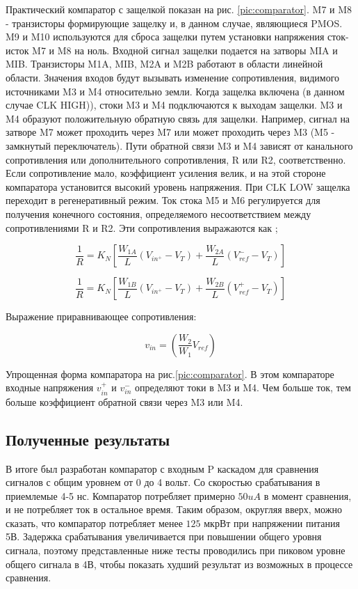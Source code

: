 \documentclass[a4paper,12pt]{article} %
\begin{document}
  Практический компаратор с защелкой показан на рис. \ref{pic:comparator}. M7 и M8 - транзисторы формирующие защелку и, в данном случае, являющиеся PMOS. M9 и M10 используются для сброса защелки путем установки напряжения сток-исток M7 и M8 на ноль. Входной сигнал защелки подается на затворы MIA и MIB. Транзисторы M1A, MIB, M2A и M2B работают в области линейной области. Значения входов будут вызывать изменение сопротивления, видимого источниками M3 и M4 относительно земли. Когда защелка включена (в данном случае CLK HIGH)), стоки M3 и M4 подключаются к  выходам защелки. M3 и M4 образуют положительную обратную связь для защелки. Например, сигнал на затворе M7 может проходить через M7 или может проходить через M3 (M5 - замкнутый переключатель).  Пути обратной связи M3 и M4 зависят от канального сопротивления  или дополнительного сопротивления, R или R2, соответственно. Если сопротивление мало, коэффициент усиления велик, и на этой стороне компаратора установится высокий уровень напряжения\cite{op_amp_comp13}.  При CLK LOW защелка переходит в регенеративный режим.  Ток стока M5 и M6 регулируется для получения конечного состояния, определяемого несоответствием между сопротивлениями R и R2.  Эти сопротивления выражаются как ; 



\begin{equation}
    \frac{1}{R} = K_N [ \frac{W_{ 1 A}}{L}(V_{in^+} - V_T) + \frac{W_{ 2 A }}{L}(V_{ref}^- - V_T) ]
\end{equation}


\begin{equation}
    \frac{1}{R} = K_N [ \frac{W_{ 1 B}}{L}(V_{in^+} - V_T) + \frac{W_{ 2 B }}{L}(V_{ref}^+ - V_T) ]
\end{equation} \label{some_label}

Выражение приравнивающее сопротивления:

$$ v_{in} = ( \frac{W_2}{W_1}V_{ref}) $$



Упрощенная форма компаратора на рис.\ref{pic:comparator}. В этом  компараторе входные напряжения $v_{in}^+$ и $v_{in}^-$ определяют токи в M3 и M4.  Чем больше ток, тем больше коэффициент обратной связи через M3 или M4.   

\subsection{Полученные результаты }


В итоге был разработан компаратор с входным P каскадом для сравнения сигналов с общим уровнем от 0 до 4 вольт. Со скоростью срабатывания в приемлемые 4-5 нс. Компаратор потребляет примерно $50uA$ в момент сравнения, и не потребляет ток в остальное время. Таким образом, округляя вверх, можно сказать, что компаратор потребляет менее  $125$ мкрВт при  напряжении питания 5В. Задержка срабатывания увеличивается при повышении общего уровня сигнала, поэтому представленные ниже тесты проводились при пиковом уровне общего сигнала в 4В, чтобы показать худший результат из возможных в процессе сравнения. 
\end{document}
